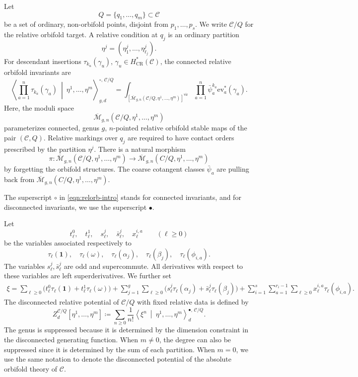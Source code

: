 \documentclass[letterpaper,12pt]{amsart}
\theoremstyle{definition}
\newcommand{\id}{\mathbf 1}
\newcommand{\cC}{\mathcal C}
\newcommand{\bM}{\overline{\mathcal M}}
\newcommand{\vir}{\mathrm{vir}}
\newcommand{\CR}{\mathrm{CR}}
\newcommand{\ev}{\mathrm{ev}}
\numberwithin{equation}{section}
\begin{document}
Let
\[
  Q=\{q_1,\ldots,q_m\}\subset \cC
\]
be a set of ordinary, non-orbifold points, disjoint from \(p_1,\ldots,p_s\).  We write \(\cC/Q\) for the relative orbifold target.  A relative condition at \(q_j\) is an ordinary partition
\[
  \eta^j=(\eta^j_1,\ldots,\eta^j_{\ell_j}).
\]
For descendant insertions \(\tau_{k_u}(\gamma_u)\), \(\gamma_u\in H^*_{\CR}(\cC)\), the connected relative orbifold invariants are 
\begin{equation}\label{eqn:relorb-intro}
\left\langle
  \prod_{a=1}^{n}\tau_{k_
a}(\gamma_
a)
  \ \middle|\ \eta^1,\ldots,\eta^m
\right\rangle^{\circ,\,\cC/Q}_{g,d}
=\int_{[\bM_{g,n}(\cC/Q,\eta^1,\ldots,\eta^m)]^{\vir}}
\prod_{a=1}^{n}\bar\psi_
a^{k_
a}\ev_
a^*(\gamma_
a).
\end{equation}
Here, the moduli space
$$\bM_{g,n}(\cC/Q,\eta^1,\ldots,\eta^m)$$
parameterizes connected, genus $g$, $n$-pointed relative orbifold stable maps of the pair $(\cC,Q)$. Relative markings over $q_j$ are required to have contact orders prescribed by the partition $\eta^j$. There is a natural morphism
\[\pi:\bM_{g,n}(\cC/Q,\eta^1,\ldots,\eta^m)\longrightarrow \bM_{g,n}(C/Q,\eta^1,\ldots,\eta^m)\]
by forgetting the orbifold structures. The coarse cotangent classes $\bar\psi_a$ are pulling back from $\bM_{g,n}(C/Q,\eta^1,\ldots,\eta^m)$.


The superscript $\circ$ in \eqref{eqn:relorb-intro} stands for connected invariants, and for disconnected invariants, we use the superscript $\bullet$.

Let
\[
t^0_\ell,\quad t^1_\ell,\quad
s^j_\ell,\quad \bar s^j_\ell,\quad
x^{i,a}_\ell
\qquad(\ell\ge0)
\]
be the variables associated respectively to
\[
\tau_\ell(\id),\quad \tau_\ell(\omega),\quad
\tau_\ell(\alpha_j),\quad \tau_\ell(\beta_j),\quad
\tau_\ell(\phi_{i,a}).
\]
The variables $s^j_\ell,\bar s^j_\ell$ are odd and supercommute.
All derivatives with respect to these variables are left superderivatives.
We further set
\[\begin{aligned}
\xi=\sum_{\ell\ge0}\bigl(t^0_\ell\tau_\ell(\id)+t^1_\ell\tau_\ell(\omega)\bigr)
 +\sum_{j=1}^g\sum_{\ell\ge0}
 \bigl(s^j_\ell\tau_\ell(\alpha_j)+\bar s^j_\ell\tau_\ell(\beta_j)\bigr)
+\sum_{i=1}^{s}\sum_{a=1}^{r_i-1}\sum_{\ell\ge0}
 x^{i,a}_\ell\tau_\ell(\phi_{i,a}).
\end{aligned}\]
The disconnected relative potential of $\cC/Q$ with fixed relative data is defined by
\[
  Z^{\cC/Q}_d[\eta^1,\ldots,\eta^m]\coloneqq \sum_{n\geq 0}\frac{1}{n!}\left\langle
 \xi^n
  \ \middle|\ \eta^1,\ldots,\eta^m
\right\rangle^{\bullet,\,\cC/Q}_{d}.
\]
The genus is suppressed because it is determined by the dimension constraint in the disconnected generating function. When $m\neq 0$, the degree can also be suppressed since it is determined by the sum of each partition.
When $m=0$, we use the same notation to denote the disconnected potential of the absolute orbifold theory of $\cC$.
\end{document}
